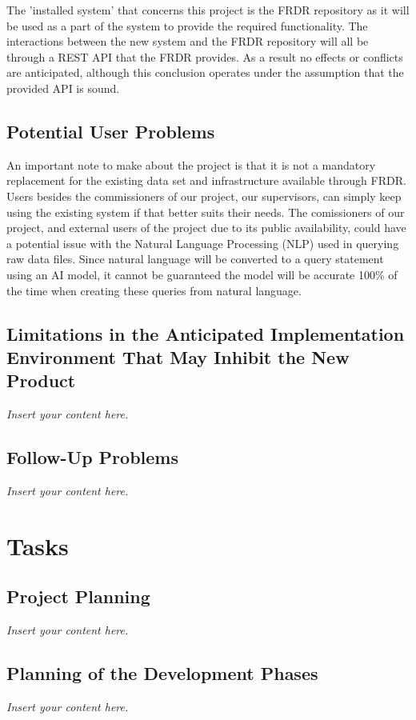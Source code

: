 \documentclass[12pt]{article}
\newcommand{\lips}{\textit{Insert your content here.}}
\begin{document}
\par{ The 'installed system' that concerns this project is the FRDR repository as it will be used as a part of the system to provide the required functionality. The interactions between the new system and
the FRDR repository will all be through a REST API that the FRDR provides. As a result no effects or conflicts are anticipated, although this conclusion operates under the assumption that the provided
API is sound. }


\subsection{Potential User Problems}

\par{An important note to make about the project is that it is not a mandatory replacement for the existing data set and infrastructure 
available through FRDR. Users besides the commissioners of our project, our supervisors, can simply keep using the existing system 
if that better suits their needs. \newline \indent The comissioners of our project, and external users of the project due to its public 
availability, could have a potential issue with the Natural Language Processing (NLP) used in querying raw data files. Since natural language 
will be converted to a query statement using an AI model, it cannot be guaranteed the model will be accurate 100\% of the time when 
creating these queries from natural language.}

\subsection{Limitations in the Anticipated Implementation Environment That May
Inhibit the New Product}
\lips
\subsection{Follow-Up Problems}
\lips

\section{Tasks}
\subsection{Project Planning}
\lips
\subsection{Planning of the Development Phases}
\lips
\end{document}
